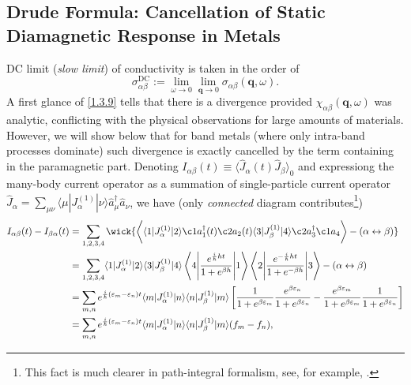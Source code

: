 \documentclass[10pt,nofootinbib,letterpaper]{revtex4}
\begin{document}
	\subsection{Drude Formula: Cancellation of Static Diamagnetic Response in Metals}
		DC limit (\emph{slow limit}) of conductivity is taken in the order of
		\begin{equation}\label{1.4.1}
			\sigma_{\alpha\beta}^{\text{DC}}:=\lim_{\omega \rightarrow0}\lim_{\bm{q}\rightarrow0}\sigma_{\alpha\beta}(\bm{q},\omega).
		\end{equation}
		A first glance of \eqref{1.3.9} tells that there is a divergence provided $\chi_{\alpha\beta}(\bm{q},\omega)$ was analytic, conflicting with the physical observations for large amounts of materials. However, we will show below that for band metals (where only intra-band processes dominate) such divergence is exactly cancelled by the term containing in the paramagnetic part. Denoting $I_{\alpha\beta}(t)\equiv\langle\hat J_\alpha(t)\hat J_\beta\rangle_0$ and expressiong the many-body current operator as a summation of single-particle current operator $\hat J_\alpha=\sum_{\mu\nu}\langle\mu|J^{(1)}_\alpha|\nu\rangle \hat a_\mu^\dagger\hat a_\nu$, we have (only \emph{connected} diagram contributes\footnote{This fact is much clearer in path-integral formalism, see, for example, \cite{fradkin2013field}.})
		\begin{align*}
			I_{\alpha\beta}(t)-I_{\beta\alpha}(t)&=\sum_{1,2,3,4}\wick{\bigg\langle\langle 1|J^{(1)}_\alpha|2\rangle\c1 a_1^\dagger(t) \c2 a_2(t)\langle 3|J^{(1)}_\beta|4\rangle \c2 a_3^\dagger \c1 a_4\bigg\rangle-(\alpha\leftrightarrow\beta)}\\
			&=\sum_{1,2,3,4}\langle 1|J^{(1)}_\alpha|2\rangle\langle 3|J^{(1)}_\beta|4\rangle\left\langle 4\middle|\dfrac{e^{\frac{i}{\hbar}ht}}{1+e^{\beta h}}\middle|1\right\rangle\left\langle2\middle|\dfrac{e^{-\frac{i}{\hbar}ht}}{1+e^{-\beta h}}\middle|3\right\rangle-(\alpha\leftrightarrow\beta)\\
			&=\sum_{m,n}e^{\frac{i}{\hbar}(\varepsilon_m-\varepsilon_n)t}\langle m|J^{(1)}_\alpha|n\rangle\langle n|J^{(1)}_\beta|m\rangle\left[\dfrac{1}{1+e^{\beta \varepsilon_m}}\dfrac{e^{\beta \varepsilon_n}}{1+e^{\beta \varepsilon_n}}-\dfrac{e^{\beta \varepsilon_m}}{1+e^{\beta \varepsilon_m}}\dfrac{1}{1+e^{\beta \varepsilon_n}}\right]\\
			&=\sum_{m,n}e^{\frac i\hbar(\varepsilon_m-\varepsilon_n)t}\langle m|J^{(1)}_\alpha|n\rangle\langle n|J^{(1)}_\beta|m\rangle(f_m-f_n),
		\end{align*}
\end{document}
